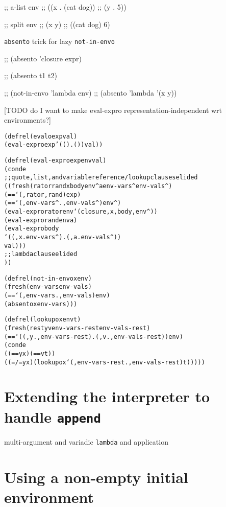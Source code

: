 \documentclass{book}
\begin{document}
;; a-list env
;; ((x . (cat dog))
;;  (y . 5))

;; split env
;; (x y)
;; ((cat dog) 6)

\verb|absento| trick for lazy \verb|not-in-envo|

;; (absento 'closure expr)

;; (absento t1 t2)

;; (not-in-envo 'lambda env)
;; (absento 'lambda '(x y))

[TODO do I want to make eval-expro representation-independent wrt environments?]

\begin{alltt}
(defrel (evalo exp val)
  (eval-expro exp '(() . ()) val))
\end{alltt}

\begin{alltt}  
(defrel (eval-expro exp env val)
  (conde
    ;; quote, list, and variable reference/lookup clauses elided
    ((fresh (rator rand x body env^ a env-vars^ env-vals^)
       (== `(,rator ,rand) exp)
       (== `(,env-vars^ . ,env-vals^) env^)
       (eval-expro rator env `(closure ,x ,body ,env^))
       (eval-expro rand env a)
       (eval-expro body
                  `((,x . env-vars^) . (,a . env-vals^))
                  val)))
    ;; lambda clause elided
    ))
\end{alltt}

\begin{alltt}
(defrel (not-in-envo x env)
  (fresh (env-vars env-vals)
    (== `(,env-vars . ,env-vals) env)
    (absento x env-vars)))
\end{alltt}

\begin{alltt}
(defrel (lookupo x env t)
  (fresh (rest y v env-vars-rest env-vals-rest)
    (== `((,y . ,env-vars-rest) . (,v . ,env-vals-rest)) env)
    (conde
      ((== y x) (== v t))
      ((=/= y x) (lookupo x `(,env-vars-rest . ,env-vals-rest) t)))))
\end{alltt}


\chapter{Extending the interpreter to handle \texttt{append}}%

multi-argument and variadic \verb|lambda| and application 


\chapter{Using a non-empty initial environment}%
\end{document}
